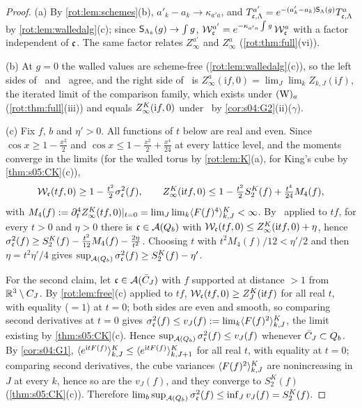 \begin{proof}
(a) By \cref{rot:lem:schemes}(b), $a'_k-a_k\to\kappa_{a'a}$, and $T^{a'}_{\mathfrak c,\Lambda}=e^{-(a'_k-a_k)\mathsf S_\Lambda(g)}T^{a}_{\mathfrak c,\Lambda}$
by \cref{rot:lem:walledalg}(c); since $\mathsf S_{\Lambda_k}(g)\to\int g$, $\mathcal W^{a'}_{\mathfrak c}=e^{-\kappa_{a'a}\int g}\,\mathcal W^a_{\mathfrak c}$ with a factor independent
of $\mathfrak c$. The same factor relates $Z^{a'}_\infty$ and $Z^a_\infty$ (\cref{rot:thm:full}(vi)).

(b) At $g=0$ the walled values are scheme-free (\cref{rot:lem:walledalg}(c)), so the left sides of \TIa\ and \TIz\ agree, and the right
side of \TIa\ is $Z^a_\infty(\mathrm if,0)=\lim_J\lim_kZ_{k,J}(\mathrm if)$, the iterated limit of the comparison family, which exists
under $(\mathrm W)_{a}$ (\cref{rot:thm:full}(iii)) and equals $Z^{K}_{\infty}(\mathrm if,0)$ under \EC\ by \cref{cor:s04:G2}(ii)($\gamma$).

(c) Fix $f$, $b$ and $\eta'>0$. All functions of $t$ below are real and even. Since $\cos x\ge1-\frac{x^2}2$ and
$\cos x\le1-\frac{x^2}2+\frac{x^4}{24}$ at every lattice level, and the moments converge in the limits (for the walled torus by
\cref{rot:lem:K}(a), for King's cube by \cref{thm:s05:CK}(c)),
\[
\mathcal W_{\mathfrak c}(tf,0)\ge1-\tfrac{t^2}2\sigma^2_{\mathfrak c}(f),\qquad
Z^{K}_{\infty}(\mathrm itf,0)\le1-\tfrac{t^2}2S^K_2(f)+\tfrac{t^4}{24}M_4(f),
\]
with $M_4(f):=\partial_t^4Z^{K}_{\infty}(tf,0)|_{t=0}=\lim_J\lim_k\langle F(f)^4\rangle^{K}_{k,J}<\infty$. By \TIz\ applied to $tf$, for every $t>0$ and
$\eta>0$ there is $\mathfrak c\in\mathcal A(Q_{b})$ with $\mathcal W_{\mathfrak c}(tf,0)\le Z^{K}_{\infty}(\mathrm itf,0)+\eta$, hence
$\sigma^2_{\mathfrak c}(f)\ge S^K_2(f)-\frac{t^2}{12}M_4(f)-\frac{2\eta}{t^2}$. Choosing $t$ with $t^2M_4(f)/12<\eta'/2$ and then
$\eta=t^2\eta'/4$ gives $\sup_{\mathcal A(Q_{b})}\sigma^2_{\mathfrak c}(f)\ge S^K_2(f)-\eta'$.

For the second claim, let $\mathfrak c\in\mathcal A(\bar C_J)$ with $f$ supported at distance $>1$ from $\mathbb R^3\setminus C_J$. By
\cref{rot:lem:free}(c) applied to $tf$, $\mathcal W_{\mathfrak c}(tf,0)\ge Z^{K}_{J}(\mathrm itf)$ for all real $t$, with equality ($=1$) at $t=0$; both sides
are even and smooth, so comparing second derivatives at $t=0$ gives $\sigma^2_{\mathfrak c}(f)\le v_J(f):=\lim_k\langle F(f)^2\rangle^{K}_{k,J}$, the limit
existing by \cref{thm:s05:CK}(c). Hence $\sup_{\mathcal A(Q_{b})}\sigma^2_{\mathfrak c}(f)\le v_J(f)$ whenever $\bar C_J\subset Q_{b}$. By
\cref{cor:s04:G1}, $\langle e^{\mathrm itF(f)}\rangle^{K}_{k,J}\le\langle e^{\mathrm itF(f)}\rangle^K_{k,J+1}$ for all real $t$, with equality at $t=0$;
comparing second derivatives, the cube variances $\langle F(f)^2\rangle^{K}_{k,J}$ are nonincreasing in $J$ at every $k$, hence so are the $v_J(f)$, and
they converge to $S^K_2(f)$ (\cref{thm:s05:CK}(c)). Therefore $\lim_b\sup_{\mathcal A(Q_{b})}\sigma^2_{\mathfrak c}(f)\le\inf_Jv_J(f)=S^K_2(f)$.
\end{proof}

